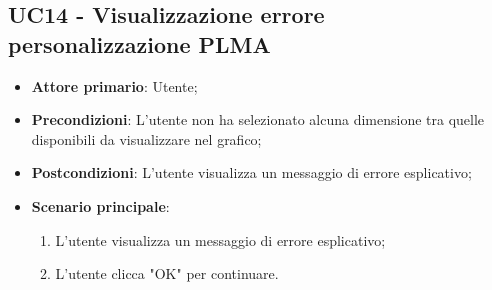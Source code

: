 \subsection{UC14 - Visualizzazione errore personalizzazione PLMA}
\begin{itemize}
	\item \textbf{Attore primario}: Utente;
	\item \textbf{Precondizioni}: L'utente non ha selezionato alcuna dimensione tra quelle disponibili da visualizzare nel grafico;
	\item \textbf{Postcondizioni}: L'utente visualizza un messaggio di errore esplicativo;
	\item \textbf{Scenario principale}:
		\begin{enumerate}
			\item L'utente visualizza un messaggio di errore esplicativo;
			\item L'utente clicca "OK" per continuare.
		\end{enumerate}
\end{itemize}